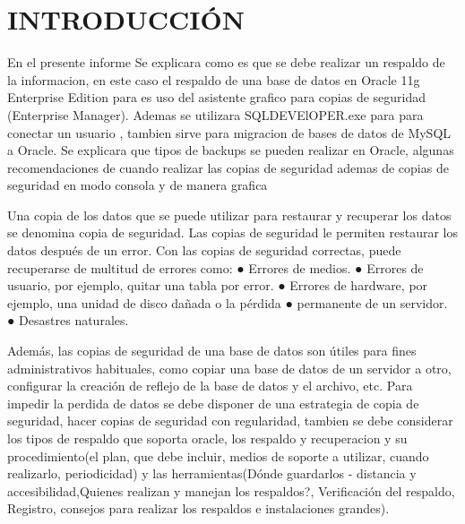 \chapter{INTRODUCCI\'ON}

\doublespacing
{}

En el presente informe Se explicara como es que se debe realizar un respaldo de la informacion, en este caso el respaldo de una base de datos en Oracle 11g Enterprise Edition para es uso del asistente grafico para copias de seguridad (Enterprise Manager).
Ademas se utilizara SQLDEVElOPER.exe para para conectar un usuario , tambien sirve para migracion de bases de datos de MySQL a Oracle.
Se explicara que tipos de backups se pueden realizar en Oracle, algunas recomendaciones de cuando realizar las copias de seguridad ademas de copias de seguridad en modo consola y de manera grafica

Una copia de los datos que se puede utilizar para restaurar y recuperar los datos se denomina copia de seguridad. Las copias de seguridad le permiten restaurar los datos después de un error. Con las copias de seguridad correctas, puede recuperarse de multitud de errores como:
●	Errores de medios.
●	Errores de usuario, por ejemplo, quitar una tabla por error.
●	Errores de hardware, por ejemplo, una unidad de disco dañada o la pérdida
●	permanente de un servidor.
●	Desastres naturales.

Además, las copias de seguridad de una base de datos son útiles para fines administrativos habituales, como copiar una base de datos de un servidor a otro, configurar la creación de reflejo de la base de datos y el archivo, etc.
Para impedir la perdida de datos se debe disponer de una estrategia de copia de seguridad, hacer copias de seguridad con regularidad, tambien se debe considerar los tipos de respaldo que soporta oracle, los respaldo y recuperacion y su procedimiento(el plan, que debe incluir, medios de soporte a utilizar, cuando realizarlo, periodicidad) y las herramientas(Dónde guardarlos - distancia y accesibilidad,Quienes realizan y manejan los  respaldos?, Verificación del respaldo, Registro, consejos para realizar los respaldos e instalaciones grandes).